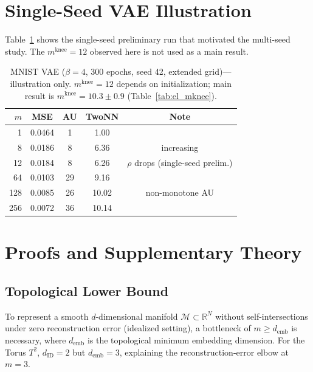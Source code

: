 \documentclass[make,article,submit,pdftex,moreauthors]{Definitions/mdpi}
\newcommand{\dID}{d_{\mathrm{ID}}}
\newcommand{\mknee}{m^{\mathrm{knee}}}
\newcommand{\demb}{d_{\mathrm{emb}}}
\newcommand{\R}{\mathbb{R}}
\begin{document}
\appendixstart
\appendix

\section[\appendixname~\thesection]{Single-Seed VAE Illustration}\label{app:single_seed}

Table~\ref{tab:e4_vae} shows the single-seed preliminary run that motivated
the multi-seed study.
The $\mknee = 12$ observed here is not used as a main result.

\begin{table}[H]
\caption{MNIST VAE ($\beta = 4$, 300 epochs, seed 42, extended grid)---
illustration only.
$\mknee = 12$ depends on initialization; main result is
$\mknee = 10.3 \pm 0.9$ (Table~\ref{tab:el_mknee}).}
\label{tab:e4_vae}
\small
\begin{tabular}{rcccc}
\toprule
$m$ & MSE & AU & TwoNN & Note \\
\midrule
1   & 0.0464 & 1  & 1.00  & \\
8   & 0.0186 & 8  & 6.36  & increasing \\
12  & 0.0184 & 8  & 6.26  & $\rho$ drops (single-seed prelim.) \\
64  & 0.0103 & 29 & 9.16  & \\
128 & 0.0085 & 26 & 10.02 & non-monotone AU \\
256 & 0.0072 & 36 & 10.14 & \\
\bottomrule
\end{tabular}
\end{table}

\section[\appendixname~\thesection]{Proofs and Supplementary Theory}\label{app:proofs}

\subsection{Topological Lower Bound}\label{app:lower_bound}

\begin{Proposition}\label{prop:lower_bound}
To represent a smooth $d$-dimensional manifold $\mathcal{M} \subset \R^N$
without self-intersections under zero reconstruction error (idealized
setting), a bottleneck of $m \geq \demb$ is necessary, where $\demb$ is
the topological minimum embedding dimension.
For the Torus $T^2$, $\dID = 2$ but $\demb = 3$, explaining the
reconstruction-error elbow at $m = 3$.
\end{Proposition}
\end{document}

